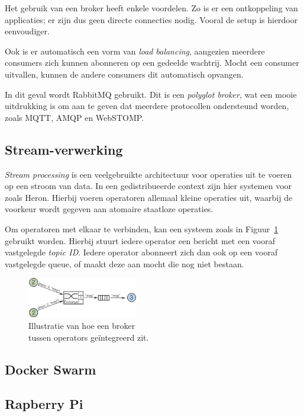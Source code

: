 \documentclass[twocolumn, a4paper]{article}
\begin{document}
Het gebruik van een broker heeft enkele voordelen. Zo is er een ontkoppeling van applicaties; er zijn dus geen directe connecties nodig. Vooral de setup is hierdoor eenvoudiger. 

Ook is er automatisch een vorm van \emph{load balancing}, aangezien meerdere consumers zich kunnen abonneren op een gedeelde wachtrij. Mocht een consumer uitvallen, kunnen de andere consumers dit automatisch opvangen. 

In dit geval wordt RabbitMQ gebruikt. Dit is een \emph{polyglot broker}, wat een mooie uitdrukking is om aan te geven dat meerdere protocollen ondersteund worden, zoals MQTT, AMQP en WebSTOMP.

\subsection{Stream-verwerking}\label{ss:stream}
\emph{Stream processing} is een veelgebruikte architectuur voor operaties uit te voeren op een stroom van data. In een gedistribueerde context zijn hier systemen voor zoals Heron. Hierbij voeren operatoren allemaal kleine operaties uit, waarbij de voorkeur wordt gegeven aan atomaire staatloze operaties.

Om operatoren met elkaar te verbinden, kan een systeem zoals in Figuur~\ref{fig:operator-queue} gebruikt worden. Hierbij stuurt iedere operator een bericht met een vooraf vastgelegde \emph{topic ID}. Iedere operator abonneert zich dan ook op een vooraf vastgelegde queue, of maakt deze aan mocht die nog niet bestaan. 

\begin{figure}[htb]
    \centering
    \includegraphics[width=0.43\textwidth]{operator_queue}
    \caption{Illustratie van hoe een broker\\tussen operators geïntegreerd zit.}\label{fig:operator-queue}
\end{figure}

\subsection{Docker Swarm}\label{ss:swarm}
\subsection{Rapberry Pi}\label{ss:rpi}
\end{document}
